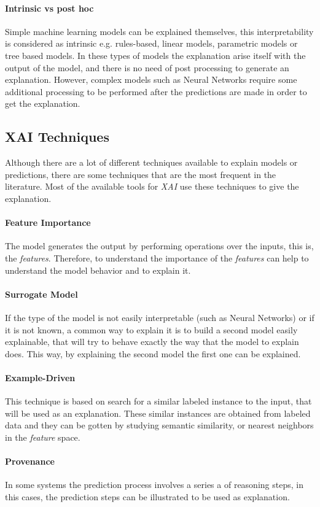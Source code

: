 \paragraph{Intrinsic vs post hoc} Simple machine learning models can be explained themselves, this interpretability is considered as intrinsic e.g. rules-based, linear models, parametric models or tree based models. In these types of models the explanation arise itself with the output of the model, and there is no need of post processing to generate an explanation. However, complex models such as Neural Networks require some additional processing to be performed after the predictions are made in order to get the explanation.
\subsection{XAI Techniques}
\noindent Although there are a lot of different techniques available to explain models or predictions, there are some techniques that are the most frequent in the literature. Most of the available tools for \emph{XAI} use these techniques to give the explanation.
	\paragraph{Feature Importance} The model generates the output by performing operations over the inputs, this is, the \emph{features}. Therefore, to understand the importance of the \emph{features} can help to understand the model behavior and to explain it.
	\paragraph{Surrogate Model} If the type of the model is not easily interpretable (such as Neural Networks) or if it is not known, a common way to explain it is to build a second model easily explainable, that will try to behave exactly the way that the model to explain does. This way, by explaining the second model the first one can be explained.
	\paragraph{Example-Driven} This technique is based on search for a similar labeled instance to the input, that will be used as an explanation. These similar instances are obtained from labeled data and they can be gotten by studying semantic similarity, or nearest neighbors in the \emph{feature} space.
	\paragraph{Provenance} In some systems the prediction process involves a series a of reasoning steps, in this cases, the prediction steps can be illustrated to be used as explanation.
